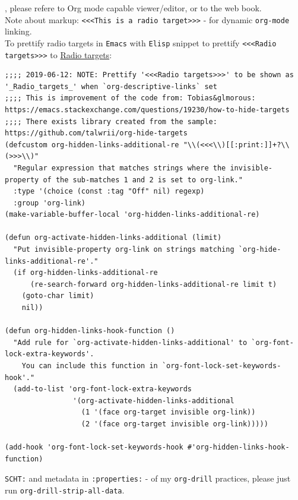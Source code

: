 \documentclass[11pt]{article}
\begin{document}
, please refere to Org mode capable viewer/editor, or to the web book.\\

Note about markup: \texttt{<<<This is a radio target>>>} - for dynamic \texttt{org-mode} linking.\\

To prettify radio targets in \texttt{Emacs} with \texttt{Elisp} snippet to prettify \texttt{<<<Radio targets>>>} to \uline{Radio targets}:\\

\begin{verbatim}
;;;; 2019-06-12: NOTE: Prettify '<<<Radio targets>>>' to be shown as '_Radio_targets_' when `org-descriptive-links` set
;;;; This is improvement of the code from: Tobias&glmorous: https://emacs.stackexchange.com/questions/19230/how-to-hide-targets
;;;; There exists library created from the sample: https://github.com/talwrii/org-hide-targets
(defcustom org-hidden-links-additional-re "\\(<<<\\)[[:print:]]+?\\(>>>\\)"
  "Regular expression that matches strings where the invisible-property of the sub-matches 1 and 2 is set to org-link."
  :type '(choice (const :tag "Off" nil) regexp)
  :group 'org-link)
(make-variable-buffer-local 'org-hidden-links-additional-re)

(defun org-activate-hidden-links-additional (limit)
  "Put invisible-property org-link on strings matching `org-hide-links-additional-re'."
  (if org-hidden-links-additional-re
      (re-search-forward org-hidden-links-additional-re limit t)
    (goto-char limit)
    nil))

(defun org-hidden-links-hook-function ()
  "Add rule for `org-activate-hidden-links-additional' to `org-font-lock-extra-keywords'.
    You can include this function in `org-font-lock-set-keywords-hook'."
  (add-to-list 'org-font-lock-extra-keywords
                '(org-activate-hidden-links-additional
                  (1 '(face org-target invisible org-link))
                  (2 '(face org-target invisible org-link)))))

(add-hook 'org-font-lock-set-keywords-hook #'org-hidden-links-hook-function)
\end{verbatim}

\texttt{SCHT:} and metadata in \texttt{:properties:} - of my \texttt{org-drill} practices, please just run \texttt{org-drill-strip-all-data}.\\
\end{document}
